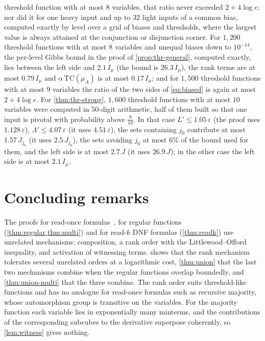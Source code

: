 \documentclass[11pt]{amsart}
\theoremstyle{definition}
\theoremstyle{remark}
\begin{document}
threshold function with at most $8$ variables, that ratio never exceeded $2+4\log e$; nor did it for one heavy input
and up to $32$ light inputs of a common bias, computed exactly by level over a grid of biases and thresholds, where the
largest value is always attained at the conjunction or disjunction corner. For $1{,}200$ threshold functions with at most $8$ variables and unequal biases down to $10^{-14}$, the
per-level Gibbs bound in the proof of \cref{prop:thr-general}, computed exactly, lies between the left side and
$2.1\,I_\mu$ (the bound is $26.3\,I_\mu$), the rank terms are at most $0.79\,I_\mu$ and $\alpha\,\mathrm{TC}(\mu_A)$
is at most $0.17\,I_\mu$; and for $1{,}500$ threshold functions with at most $9$ variables the ratio of the two sides
of \eqref{eq:biased} is again at most $2+4\log e$. For \cref{thm:thr-strong}, $1{,}600$ threshold functions with at
most $10$ variables were computed in $50$-digit arithmetic, half of them built so that one input is pivotal with
probability above $\frac9{10}$. In that case $L'\le1.05\,\varepsilon$ (the proof uses $1.128\,\varepsilon$),
$\Lambda'\le4.07\,\varepsilon$ (it uses $4.51\,\varepsilon$), the sets containing $j_0$ contribute at most
$1.57\,J_{j_0}$ (it uses $2.5\,J_{j_0}$), the sets avoiding $j_0$ at most $6\%$ of the bound used for them, and the
left side is at most $2.7\,J$ (it uses $26.9\,J$); in the other case the left side is at most $2.1\,I_\mu$.

\section{Concluding remarks}

The proofs for read-once formulas~\cite{OT13}, for regular functions (\cref{thm:regular,thm:multi}) and for
read-$k$ DNF formulas (\cref{thm:readk}) use unrelated mechanisms: composition, a rank order with the
Littlewood--Offord inequality, and activation of witnessing terms.  shows that the rank mechanism
tolerates several unrelated orders at a logarithmic cost, \cref{thm:union} that the last two mechanisms combine
when the regular functions overlap boundedly, and \cref{thm:union-multi} that the three combine. The rank order suits threshold-like functions and has no analogue
for read-once formulas such as recursive majority, whose automorphism group is transitive on the variables. For the
majority function each variable lies in exponentially many minterms, and the contributions of the corresponding
subcubes to the derivative superpose coherently, so \cref{lem:witness} gives nothing.
\end{document}
